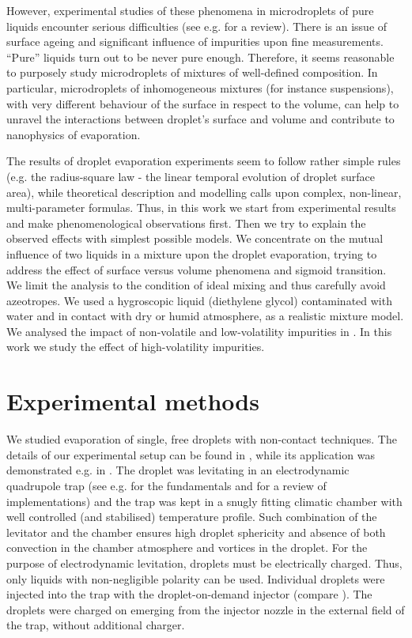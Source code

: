 \documentclass[twoside,twocolumn,9pt]{article}
\begin{document}
However, experimental studies of these phenomena in microdroplets of pure liquids encounter serious difficulties (see e.g. \cite{RoP} for a review). There is an issue of surface ageing and significant influence of impurities upon fine measurements. ``Pure'' liquids turn out to be never pure enough. Therefore, it seems reasonable to purposely study microdroplets of mixtures of well-defined composition. In particular, microdroplets of inhomogeneous mixtures (for instance suspensions), with very different behaviour of the surface in respect to the volume, can help to unravel the interactions between droplet's surface and volume and contribute to nanophysics of evaporation.

The results of droplet evaporation experiments seem to follow rather simple rules (e.g. the radius-square law - the linear temporal evolution of droplet surface area), while theoretical description and modelling calls upon complex, non-linear, multi-parameter formulas. Thus, in this work we start from experimental results and make phenomenological observations first. Then we try to explain the observed effects with simplest possible models. We concentrate on the mutual influence of two liquids in a mixture upon the droplet evaporation, trying to address the effect of surface versus volume phenomena and sigmoid transition. We limit the analysis to the condition of ideal mixing and thus carefully avoid azeotropes. We used a hygroscopic liquid (diethylene glycol) contaminated with water and in contact with dry or humid atmosphere, as a realistic mixture model. We analysed the impact of non-volatile and low-volatility impurities in \cite{Acta}. In this work we study the effect of high-volatility impurities. 

\section{Experimental methods}
We studied evaporation of single, free droplets with non-contact techniques. The details of our experimental setup can be found in \cite{weightvsscatt,Smigacz}, while its application was demonstrated e.g. in \cite{Hi-precission,HK-soft_matter,RoP,vs_molecular_mass,Archer}. The droplet was levitating in an electrodynamic quadrupole trap (see e.g. \cite{Paul} for the fundamentals and \cite{Knoop,Major} for a review of implementations)  and the trap was kept in a snugly fitting climatic chamber with well controlled (and stabilised) temperature profile. Such combination of the levitator and the chamber ensures high droplet sphericity and absence of both convection in the chamber atmosphere and vortices in the droplet. For the purpose of electrodynamic levitation, droplets must be electrically charged. Thus, only liquids with non-negligible polarity can be used. Individual droplets were injected into the trap with the droplet-on-demand injector (compare \cite{Wriedt}). The droplets were charged on emerging from the injector nozzle in the external field of the trap, without additional charger.
\end{document}
